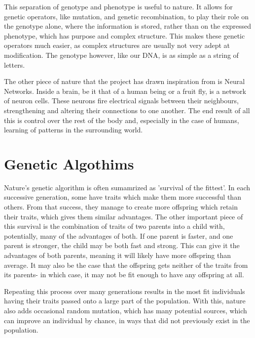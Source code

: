 \documentclass[a4paper,11pt]{report}
\begin{document}
This separation of genotype and phenotype is useful to nature. It allows for genetic operators, like 
mutation, and genetic recombination, to play their 
role on the genotype alone, where the information is stored, rather than on the expressed phenotype, which 
has purpose and complex structure. This makes these genetic operators much easier, as complex structures 
are usually not very adept at modification. The genotype however, like our DNA, is as simple as a string 
of letters. 

The other piece of nature that the project has drawn inspiration from is Neural Networks. Inside a brain, 
be it that of a human being or a fruit fly, is a network of neuron cells. These neurons fire electrical 
signals between their neighbours, strengthening and altering their connections to one another. The end 
result of all this is control over the rest of the body and, especially in the case of humans, learning
of patterns in the surrounding world. 

\section{Genetic Algothims}

Nature's genetic algorithm is often sumamrized as 'survival of the fittest'. In each successive 
generation, some have traits which make them more successful than others. From that success,
they manage to create more offspring which retain their traits, which gives them similar advantages. 
The other important piece of this survival is the combination of traits of two parents into a child
with, potentially, many of the advantages of both. If one parent is faster, and one parent is stronger, 
the child may be both fast and strong. This can give it the advantages of both 
parents, meaning it will likely have more offspring than average. 
It may also be the case that the offspring gets neither of the 
traits from its parents- in which case, it may not be fit enough to have any offspring at all.

Repeating this process over many generations results in the most fit individuals having their traits 
passed onto a large part of the population. With this, nature also adds occasional random mutation, 
which has many potential sources, which can improve an individual by chance, in ways that did not 
previously exist in the population.
\end{document}
